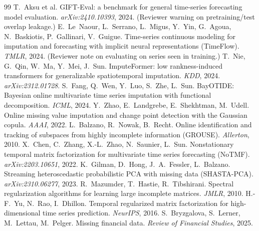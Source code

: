\documentclass[10pt,twocolumn]{article}
\begin{document}
\begin{thebibliography}{99}
 T.~Aksu et al. GIFT-Eval: a benchmark for general
time-series forecasting model evaluation. \emph{arXiv:2410.10393}, 2024.
(Reviewer warning on pretraining/test overlap leakage.)
 E.~Le~Naour, L.~Serrano, L.~Migus, Y.~Yin, G.~Agoua,
N.~Baskiotis, P.~Gallinari, V.~Guigue. Time-series continuous modeling for
imputation and forecasting with implicit neural representations (TimeFlow).
\emph{TMLR}, 2024. (Reviewer note on evaluating on series seen in training.)
 T.~Nie, G.~Qin, W.~Ma, Y.~Mei, J.~Sun.
ImputeFormer: low rankness-induced transformers for generalizable spatiotemporal
imputation. \emph{KDD}, 2024. \emph{arXiv:2312.01728}.
 S.~Fang, Q.~Wen, Y.~Luo, S.~Zhe, L.~Sun. BayOTIDE:
Bayesian online multivariate time series imputation with functional
decomposition. \emph{ICML}, 2024.
 Y.~Zhao, E.~Landgrebe, E.~Shekhtman, M.~Udell. Online
missing value imputation and change point detection with the Gaussian copula.
\emph{AAAI}, 2022.
 L.~Balzano, R.~Nowak, B.~Recht. Online identification
and tracking of subspaces from highly incomplete information (GROUSE).
\emph{Allerton}, 2010.
 X.~Chen, C.~Zhang, X.-L.~Zhao, N.~Saunier, L.~Sun.
Nonstationary temporal matrix factorization for multivariate time series
forecasting (NoTMF). \emph{arXiv:2203.10651}, 2022.
 K.~Gilman, D.~Hong, J.~A.~Fessler, L.~Balzano.
Streaming heteroscedastic probabilistic PCA with missing data (SHASTA-PCA).
\emph{arXiv:2310.06277}, 2023.
 R.~Mazumder, T.~Hastie, R.~Tibshirani. Spectral
regularization algorithms for learning large incomplete matrices. \emph{JMLR},
2010.
 H.-F.~Yu, N.~Rao, I.~Dhillon. Temporal regularized matrix
factorization for high-dimensional time series prediction. \emph{NeurIPS}, 2016.
 S.~Bryzgalova, S.~Lerner, M.~Lettau, M.~Pelger.
Missing financial data. \emph{Review of Financial Studies}, 2025.
\end{thebibliography}
\end{document}
